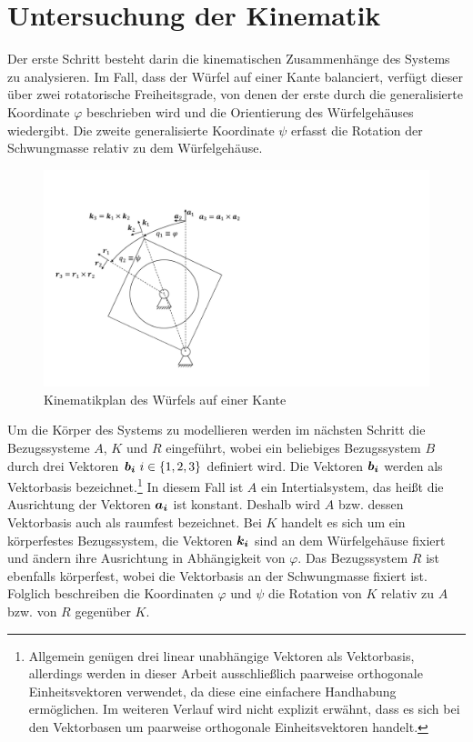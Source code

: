 \section{Untersuchung der Kinematik}
Der erste Schritt besteht darin die kinematischen Zusammenhänge des Systems zu analysieren. Im Fall, dass der Würfel auf einer Kante balanciert, verfügt dieser über zwei rotatorische Freiheitsgrade, von denen der erste durch die generalisierte Koordinate $\varphi$ beschrieben wird und die Orientierung des Würfelgehäuses wiedergibt. Die zweite generalisierte Koordinate $\psi$ erfasst die Rotation der Schwungmasse relativ zu dem Würfelgehäuse.
\begin{figure}[!ht]
\centering
\includegraphics[width=0.6\linewidth, trim={1cm 1.5cm 18cm 3.5cm}, clip]{img/ModellWuerfelseite}
\caption{Kinematikplan des Würfels auf einer Kante}
\label{skizze_dynamik_edge}
\end{figure}

Um die Körper des Systems zu modellieren werden im nächsten Schritt die Bezugssysteme $A$, $K$ und $R$ eingeführt, wobei ein beliebiges Bezugssystem $B$ durch drei Vektoren $\boldsymbol{b_i} \ i \in \{1,2,3\}$ definiert wird. Die Vektoren $\boldsymbol{b_i}$ werden als Vektorbasis bezeichnet.\footnote{Allgemein genügen drei linear unabhängige Vektoren als Vektorbasis, allerdings werden in dieser Arbeit ausschließlich paarweise orthogonale Einheitsvektoren verwendet, da diese eine einfachere Handhabung ermöglichen. Im weiteren Verlauf wird nicht explizit erwähnt, dass es sich bei den Vektorbasen um paarweise orthogonale Einheitsvektoren handelt.} In diesem Fall ist $A$ ein Intertialsystem, das heißt die Ausrichtung der Vektoren $\boldsymbol{a_i}$ ist konstant. Deshalb wird $A$ bzw. dessen Vektorbasis auch als raumfest bezeichnet. Bei $K$ handelt es sich um ein körperfestes Bezugssystem, die Vektoren $\boldsymbol{k_i}$ sind an dem Würfelgehäuse fixiert und ändern ihre Ausrichtung in Abhängigkeit von $\varphi$. Das Bezugssystem $R$ ist ebenfalls körperfest, wobei die Vektorbasis an der Schwungmasse fixiert ist. Folglich beschreiben die Koordinaten $\varphi$ und $\psi$ die Rotation von $K$ relativ zu $A$ bzw. von $R$ gegenüber $K$. 

